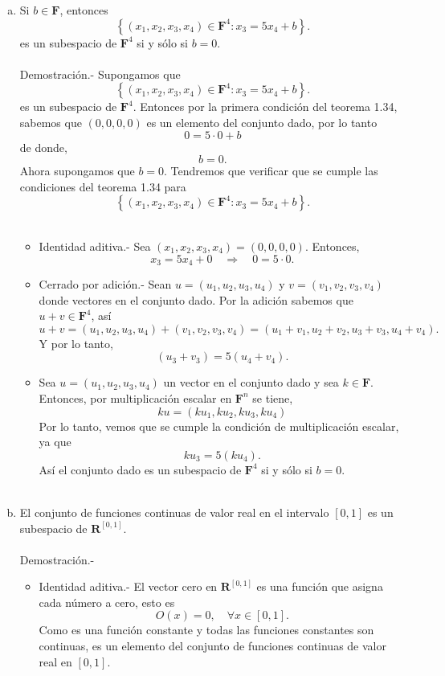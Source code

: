 \begin{enumerate}[\bfseries 1.]
\begin{enumerate}[(a)]
	    \item Si $b\in \textbf{F}$, entonces
	    $$\left\{(x_1,x_2,x_3,x_4)\in \textbf{F}^4 : x_3 = 5x_4+b\right\}.$$
	    es un subespacio de $\textbf{F}^4$ si y sólo si $b=0$.\\\\
		Demostración.-\; Supongamos que 
		$$\left\{(x_1,x_2,x_3,x_4)\in \textbf{F}^4 : x_3 = 5x_4+b\right\}.$$
		es un subespacio de $\textbf{F}^4$. Entonces por la primera condición del teorema 1.34, sabemos que $(0,0,0,0)$ es un elemento del conjunto dado, por lo tanto
		$$0=5\cdot 0 + b$$
		de donde,
		$$b=0.$$
		Ahora supongamos que $b=0$. Tendremos que verificar que se cumple las condiciones del teorema 1.34 para 
		$$\left\{(x_1,x_2,x_3,x_4)\in \textbf{F}^4 : x_3 = 5x_4+b\right\}.$$\\

		\begin{itemize}
		    \item Identidad aditiva.-\; Sea $(x_1,x_2,x_3,x_4)=(0,0,0,0)$. Entonces,
			$$x_3=5x_4+0 \quad \Rightarrow \quad 0=5\cdot 0.$$

		    \item Cerrado por adición.-\; Sean $u=(u_1,u_2,u_3,u_4)$ y $v=(v_1,v_2,v_3,v_4)$ donde vectores en el conjunto dado. Por la adición sabemos que $u+v\in \textbf{F}^4$, así
			$$u+v=(u_1,u_2,u_3,u_4)+(v_1,v_2,v_3,v_4)=(u_1+v_1,u_2+v_2,u_3+v_3,u_4+v_4).$$
			Y por lo tanto,
			$$(u_3+v_3)=5(u_4+v_4).$$

		    \item Sea $u=(u_1,u_2,u_3,u_4)$ un vector en el conjunto dado y sea $k\in \textbf{F}$. Entonces, por multiplicación escalar en $\textbf{F}^n$ se tiene, 
			$$ku=(ku_1,ku_2,ku_3,ku_4)$$
			Por lo tanto, vemos que se cumple la condición de multiplicación escalar, ya que
			$$ ku_3 = 5(ku_4).$$
			Así el conjunto dado es un subespacio de $\textbf{F}^4$ si y sólo si $b=0$.\\\\
		\end{itemize}

	    \item El conjunto de funciones continuas de valor real en el intervalo $[0,1]$ es un subespacio de $\textbf{R}^{[0,1]}$.\\\\
		Demostración.-\; 
		\begin{itemize}
		    \item Identidad aditiva.-\; El vector cero en $\textbf{R}^{[0,1]}$ es una función que asigna cada número a cero, esto es
			$$O(x)=0,\quad \forall x \in [0,1].$$
			Como es una función constante y todas las funciones constantes son continuas, es un elemento del conjunto de funciones continuas de valor real en $[0,1]$.


\end{itemize}
\end{enumerate}
\end{enumerate}
